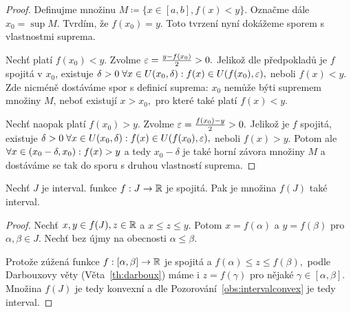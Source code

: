 \begin{proof}
    Definujme množinu $M \coloneqq \{x \in [a,b], f(x) < y \}.$ Označme dále 
    $x_0 = \sup M.$ Tvrdím, že $f(x_0) = y.$ Toto tvrzení nyní dokážeme
    sporem s vlastnostmi suprema.

    Nechť platí $f(x_0) < y.$ Zvolme $\varepsilon = \frac{y - f(x_0)}{2} > 0.$ Jelikož
    dle předpokladů je $f$ spojitá v $x_0$, existuje $\delta > 0 \; 
    \forall x \in U(x_0, \delta): f(x) \in U(f(x_0), \varepsilon),$ neboli $f(x) < y.$ 
    Zde nicméně dostáváme spor s definicí suprema: $x_0$ nemůže býti 
    supremem množiny $M$, neboť existují $x > x_0,$ pro které také 
    platí $f(x) < y.$

    Nechť naopak platí $f(x_0) > y.$ Zvolme $\varepsilon = \frac{f(x_0) - y}{2} > 0.$
    Jelikož je $f$ spojitá, existuje $\delta > 0 \; \forall x \in U(x_0, \delta):
    f(x) \in U(f(x_0), \varepsilon),$ neboli $f(x) > y.$ Potom ale $\forall x \in (x_0-\delta,
    x_0): f(x) > y$ a tedy $x_0 - \delta$ je také horní závora množiny $M$ 
    a dostáváme se tak do sporu s druhou vlastností suprema.
\end{proof}

\begin{theorem}
    Nechť $J$ je interval. \Necht funkce $f: J \rightarrow \mathbb{R}$ je spojitá.
    Pak je množina $f(J)$ také interval.
\end{theorem}

\begin{proof}
    Nechť $x,y \in f(J), z \in \mathbb{R}$ a $x \leq z \leq y.$ Potom $x = f(\alpha)$
    a $y = f(\beta)$ pro $\alpha, \beta \in J.$ Nechť bez újmy na obecnosti 
    $\alpha \leq \beta.$

    Protože zúžená funkce $f: [\alpha, \beta] \rightarrow \mathbb{R}$ je spojitá
    a $f(\alpha) \leq z \leq f(\beta),$ podle Darbouxovy věty 
    (Věta~\ref{th:darboux}) máme
    i $z = f(\gamma)$ pro nějaké $\gamma \in [\alpha,\beta].$ Množina $f(J)$ je 
    tedy konvexní a dle Pozorování~\ref{obs:intervalconvex} je tedy interval.
\end{proof}

